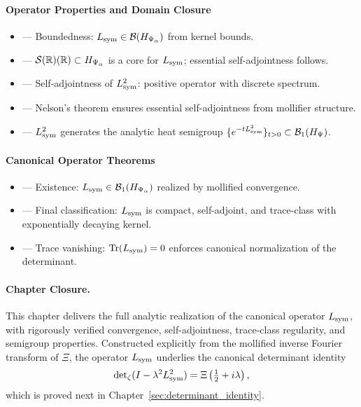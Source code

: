 \paragraph{Operator Properties and Domain Closure}
\begin{itemize}
  \item {} — Boundedness: \( L_{\mathrm{sym}} \in \mathcal{B}(H_{\Psi_\alpha}) \) from kernel bounds.
  \item {} — \( \mathcal{S}(\mathbb{R})(\mathbb{R}) \subset H_{\Psi_\alpha} \) is a core for \( L_{\mathrm{sym}} \); essential self-adjointness follows.
  \item {} — Self-adjointness of \( L_{\mathrm{sym}}^2 \): positive operator with discrete spectrum.
  \item {} — Nelson's theorem ensures essential self-adjointness from mollifier structure.
  \item {} — \( L_{\mathrm{sym}}^2 \) generates the analytic heat semigroup \( \{ e^{-t L_{\mathrm{sym}}^2} \}_{t > 0} \subset \mathcal{B}_1(H_{\Psi}) \).
\end{itemize}

\paragraph{Canonical Operator Theorems}
\begin{itemize}
  \item {} — Existence: \( L_{\mathrm{sym}} \in \mathcal{B}_1(H_{\Psi_\alpha}) \) realized by mollified convergence.
  \item {} — Final classification: \( L_{\mathrm{sym}} \) is compact, self-adjoint, and trace-class with exponentially decaying kernel.
  \item {} — Trace vanishing: \( \operatorname{Tr}(L_{\mathrm{sym}}) = 0 \) enforces canonical normalization of the determinant.
\end{itemize}

\paragraph{Chapter Closure.}
This chapter delivers the full analytic realization of the canonical operator \( L_{\mathrm{sym}} \), with rigorously verified convergence, self-adjointness, trace-class regularity, and semigroup properties. Constructed explicitly from the mollified inverse Fourier transform of \( \Xi \), the operator \( L_{\mathrm{sym}} \) underlies the canonical determinant identity
\[
\det\nolimits_{\zeta}(I - \lambda^2 L_{\mathrm{sym}}^2) = \Xi\left(\tfrac{1}{2} + i\lambda\right),
\]
which is proved next in Chapter~\ref{sec:determinant_identity}.
